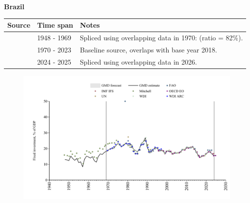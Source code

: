 \documentclass[12pt,a4paper,landscape]{article}
\begin{document}
\begin{adjustbox}{max totalsize={\paperwidth}{\paperheight},center}
\begin{minipage}[t][\textheight][t]{\textwidth}
\vspace*{0.5cm}
{}
\begin{center}
{\Large\bfseries Brazil}
\end{center}
\vspace{0.5cm}
\begin{table}[H]
\centering
\small
\begin{tabular}{|l|l|l|}
\hline
\textbf{Source} & \textbf{Time span} & \textbf{Notes} \\
\hline
\rowcolor{white}\cite{Mitchell}& 1948 - 1969 &Spliced using overlapping data in 1970: (ratio = 82\%).\\
\rowcolor{lightgray}\cite{WDI}& 1970 - 2023 &Baseline source, overlaps with base year 2018.\\
\rowcolor{white}\cite{OECD_EO}& 2024 - 2025 &Spliced using overlapping data in 2026.\\
\hline
\end{tabular}
\end{table}
\begin{figure}[H]
\centering
\includegraphics[width=\textwidth,height=0.6\textheight,keepaspectratio]{graphs/BRA_finv_GDP.pdf}
\end{figure}
\end{minipage}
\end{adjustbox}
\end{document}

